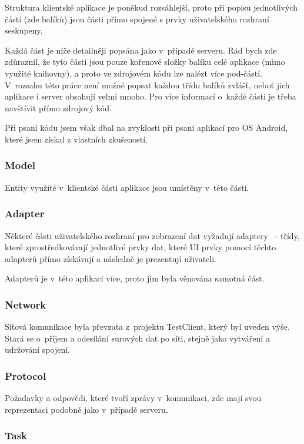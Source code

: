 \documentclass[thesis=B,czech]{FITthesis}[2013/10/20]
\begin{document}
Struktura klientské aplikace je poněkud rozsáhlejší, proto při popisu jednotlivých částí (zde balíků) jsou části přímo spojené s prvky uživatelského rozhraní seskupeny.

Každá část je níže detailněji popsána jako v~případě serveru. Rád bych zde zdůraznil, že tyto části jsou pouze kořenové složky balíku celé aplikace (mimo využité knihovny), a proto ve zdrojovém kódu lze nalézt více pod-částí. V~rozsahu této práce není možné popsat každou třídu balíků zvlášť, neboť jich aplikace i server obsahují velmi mnoho. Pro více informací o~každé části je třeba navštívit přímo zdrojový kód.

Při psaní kódu jsem však dbal na zvyklosti při psaní aplikací pro OS Android, které jsem získal z vlastních zkušeností.

\subsubsection{Model}

Entity využité v~klientské části aplikace jsou umístěny v~této části.

\subsubsection{Adapter}

Některé části uživatelského rozhraní pro zobrazení dat vyžadují adaptery~\cite{adapter} - třídy, které zprostředkovávají jednotlivé prvky dat, které UI prvky pomocí těchto adapterů přímo získávají a následně je prezentují uživateli. 

Adapterů je v~této aplikaci více, proto jim byla věnována samotná část.

\subsubsection{Network}

Síťová komunikace byla převzata z~projektu TestClient, který byl uveden výše. Stará se o~příjem a odesílání surových dat po síti, stejně jako vytváření a udržování spojení.

\subsubsection{Protocol}

Požadavky a odpovědi, které tvoří zprávy v~komunikaci, zde mají svou reprezentaci podobně jako v~případě serveru.

\subsubsection{Task}
\end{document}
